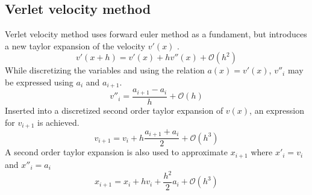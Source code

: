 \documentclass[twoside,twocolumn]{article}
\begin{document}
\subsection{Verlet velocity method}
Verlet velocity method uses forward euler method as a fundament, but introduces a new taylor expansion of the velocity $v'(x)$ .
\begin{equation*}
v'(x+h)=v'(x)+hv''(x)+\mathcal{O}(h^2)
\end{equation*}
While discretizing the variables and using the relation $a(x)=v'(x)$, $v''_i$ may be expressed using $a_i$ and $a_{i+1}$.
\begin{equation*}
v''_i=\frac{a_{i+1}-a_i}{h}+\mathcal{O}(h) 
\end{equation*}
Inserted into a discretized second order taylor expansion of $v(x)$, an expression for $v_{i+1}$ is achieved.
\begin{equation}
v_{i+1}=v_i+h\frac{a_{i+1}+a_i}{2} + \mathcal{O}(h^3)
\end{equation}
A second order taylor expansion is also used to approximate $x_{i+1}$ where $x'_i=v_i$ and $x''_i=a_i$
\begin{equation}
x_{i+1}=x_i+hv_i+\frac{h^2}{2}a_i + \mathcal{O}(h^3)
\end{equation}
\end{document}
